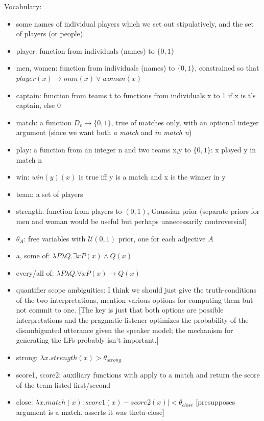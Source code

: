 \documentclass[pdfextras]{handbook}
\begin{document}
\noindent Vocabulary:
\begin{itemize}
\item some names of individual players which we set out stipulatively, and the set of players (or people).
\item player: function from individuals (names) to $\{0,1\}$
\item men, women: function from individuals (names) to $\{0,1\}$, constrained so that $\mathit{player}(x) \rightarrow \mathit{man}(x) \vee \mathit{woman}(x)$
\item captain: function from teams t to functions from individuals x to 1 if x is t's captain, else 0
\item match: a function $D_e \rightarrow \{0,1\}$, true of matches only, with an optional integer argument (since we want both \emph{a match} and \emph{in match n}) 
\item play: a function from an integer n and two teams x,y to $\{0,1\}$: x played y in match n
\item win: $\mathit{win}(y)(x)$ is true iff y is a match and x is the winner in y
\item team: a set of players
\item strength: function from players to $(0,1)$, Gaussian prior (separate priors for men and woman would be useful but perhaps unnecessarily controversial)
\item $\theta_A$: free variables with $\mathcal{U}(0,1)$ prior, one for each adjective $A$
\item a, some of: $\lambda P \lambda Q . \exists x P(x) \wedge Q(x)$
\item every/all of: $\lambda P \lambda Q . \forall x P(x) \rightarrow Q(x)$
\item quantifier scope ambiguities: I think we should just give the truth-conditions of the two interpretations, mention various options for computing them but not commit to one. [The key is just that both options are possible interpretations and the pragmatic listener optimizes the probability of the disambiguated utterance given the speaker model; the mechanism for generating the LFs probably isn't important.]
\item strong: $\lambda x . \mathit{strength}(x) > \theta_{\mathit{strong}}$
\item score1, score2: auxiliary functions with apply to a match and return the score of the team listed first/second 
\item close: $\lambda x . \mathit{match}(x): \mathit{score1}(x) - \mathit{score2}(x)| < \theta_{\mathit{close}}$ [presupposes argument is a match, asserts it was theta-close]

\end{itemize}
\end{document}
